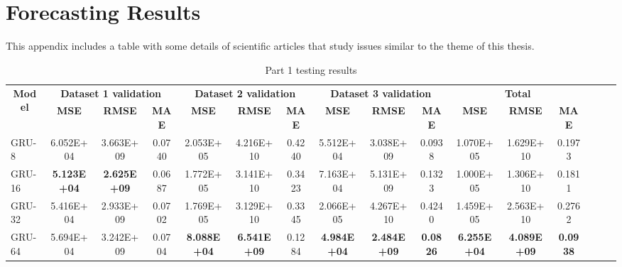 \chapter{Forecasting Results}


\label{chapter:appendixC}

This appendix includes a table with some details of scientific articles that study issues similar to the theme of this thesis.



\begin{landscape}
\begin{longtable}{|l|c|c|c|c|c|c|c|c|c|c|c|c|c|c|c|}
     \caption{Part 1 testing results}
     \label{table7}\\
    \toprule
    \multicolumn{1}{|c|}{\multirow{3}[2]{*}{\textbf{Model}}} & \multicolumn{3}{c|}{\textbf{Dataset 1 validation}} & \multicolumn{3}{c|}{\textbf{Dataset 2 validation}} & \multicolumn{3}{c|}{\textbf{Dataset 3 validation}} & \multicolumn{3}{c|}{\textbf{Total}} \\
          & \multirow{2}[1]{*}{\textbf{MSE}} & \multirow{2}[1]{*}{\textbf{RMSE}} & \multirow{2}[1]{*}{\textbf{MAE}} & \multirow{2}[1]{*}{\textbf{MSE}} & \multirow{2}[1]{*}{\textbf{RMSE}} & \multirow{2}[1]{*}{\textbf{MAE}} & \multirow{2}[1]{*}{\textbf{MSE}} & \multirow{2}[1]{*}{\textbf{RMSE}} & \multirow{2}[1]{*}{\textbf{MAE}} & \multirow{2}[1]{*}{\textbf{MSE}} & \multirow{2}[1]{*}{\textbf{RMSE}} & \multirow{2}[1]{*}{\textbf{MAE}} \\
          &       &       &       &       &       &       &       &       &       &       &       &  \\
    \midrule
    \endhead
    GRU-8 & 6.052E+04 & 3.663E+09 & 0.0740 & 2.053E+05 & 4.216E+10 & 0.4240 & 5.512E+04 & 3.038E+09 & 0.0938 & 1.070E+05 & 1.629E+10 & 0.1973 \\
    GRU-16 & \cellcolor[rgb]{ .573,  .816,  .314}\textbf{5.123E+04} & \cellcolor[rgb]{ .573,  .816,  .314}\textbf{2.625E+09} & 0.0687 & 1.772E+05 & 3.141E+10 & 0.3423 & 7.163E+04 & 5.131E+09 & 0.1323 & 1.000E+05 & 1.306E+10 & 0.1811 \\
    GRU-32 & 5.416E+04 & 2.933E+09 & 0.0702 & 1.769E+05 & 3.129E+10 & 0.3345 & 2.066E+05 & 4.267E+10 & 0.4240 & 1.459E+05 & 2.563E+10 & 0.2762 \\
    GRU-64 & 5.694E+04 & 3.242E+09 & 0.0704 & \cellcolor[rgb]{ .573,  .816,  .314}\textbf{8.088E+04} & \cellcolor[rgb]{ .573,  .816,  .314}\textbf{6.541E+09} & 0.1284 & \cellcolor[rgb]{ .573,  .816,  .314}\textbf{4.984E+04} & \cellcolor[rgb]{ .573,  .816,  .314}\textbf{2.484E+09} & \cellcolor[rgb]{ .573,  .816,  .314}\textbf{0.0826} & \cellcolor[rgb]{ .573,  .816,  .314}\textbf{6.255E+04} & \cellcolor[rgb]{ .573,  .816,  .314}\textbf{4.089E+09} & \cellcolor[rgb]{ .573,  .816,  .314}\textbf{0.0938} \\

\end{longtable}
\end{landscape}
